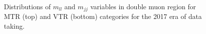 \begin{figure}[htbp]
{    }
  \caption{Distributions of $m_{ll}$ and $m_{jj}$ variables in double muon region for MTR (top) and VTR (bottom) categories for the 2017 era of data taking.}
  \label{fig:2017_Zee_1}
\end{figure}

